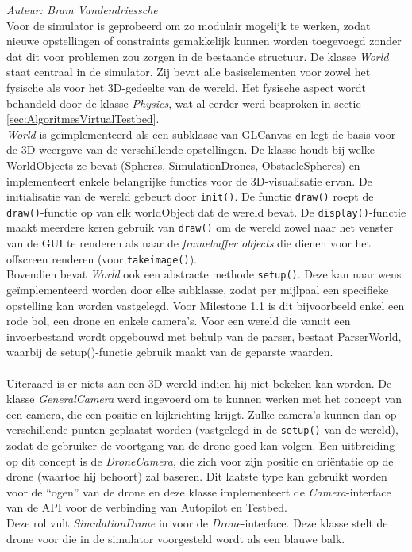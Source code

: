 {\em Auteur: Bram Vandendriessche}
\\

\noindent
Voor de simulator is geprobeerd om zo modulair mogelijk te werken, zodat nieuwe opstellingen of constraints gemakkelijk kunnen worden toegevoegd zonder dat dit voor problemen zou zorgen in de bestaande structuur. De klasse \textit{World} staat centraal in de simulator. Zij bevat alle basiselementen voor zowel het fysische als voor het 3D-gedeelte van de wereld. Het fysische aspect wordt behandeld door de klasse \textit{Physics}, wat al eerder werd besproken in sectie \ref{sec:AlgoritmesVirtualTestbed}. 
\\

\noindent
\textit{World} is ge\"implementeerd als een subklasse van GLCanvas en legt de basis voor de 3D-weergave van de verschillende opstellingen. 
De klasse houdt bij welke WorldObjects ze bevat (Spheres, SimulationDrones, ObstacleSpheres) en implementeert enkele belangrijke functies voor de 3D-visualisatie ervan. De initialisatie van de wereld gebeurt door \texttt{init()}. De functie \texttt{draw()} roept de \texttt{draw()}-functie op van elk worldObject dat de wereld bevat. De \texttt{display()}-functie maakt meerdere keren gebruik van \texttt{draw()} om de wereld zowel naar het venster van de GUI te renderen als naar de \textit{framebuffer objects} die dienen voor het offscreen renderen (voor \texttt{takeimage()}).\\
Bovendien bevat \textit{World} ook een abstracte methode \texttt{setup()}. Deze kan naar wens ge\"implementeerd worden door elke subklasse, zodat per mijlpaal een specifieke opstelling kan worden vastgelegd. Voor Milestone 1.1 is dit bijvoorbeeld enkel een rode bol, een drone en enkele camera's. Voor een wereld die vanuit een invoerbestand wordt opgebouwd met behulp van de parser, bestaat ParserWorld, waarbij de setup()-functie gebruik maakt van de geparste waarden.\\
\\
Uiteraard is er niets aan een 3D-wereld indien hij niet bekeken kan worden. De klasse \textit{GeneralCamera} werd ingevoerd om te kunnen werken met het concept van een camera, die een positie en kijkrichting krijgt. Zulke camera's kunnen dan op verschillende punten geplaatst worden (vastgelegd in de \texttt{setup()} van de wereld), zodat de gebruiker de voortgang van de drone goed kan volgen. Een uitbreiding op dit concept is de \textit{DroneCamera}, die zich voor zijn positie en ori\"entatie op de drone (waartoe hij behoort) zal baseren. Dit laatste type kan gebruikt worden voor de ``ogen'' van de drone en deze klasse implementeert de \textit{Camera}-interface van de API voor de verbinding van Autopilot en Testbed.\\
Deze rol vult \textit{SimulationDrone} in voor de \textit{Drone}-interface. Deze klasse stelt de drone voor die in de simulator voorgesteld wordt als een blauwe balk. 

